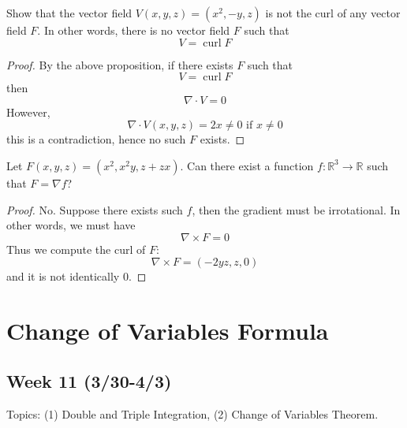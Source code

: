 \documentclass[openany]{book}
\newcommand{\R}{\mathbb{R}}
\newcommand{\curl}{\operatorname{curl}}
\begin{document}
\begin{prob}
    Show that the vector field $V(x,y,z)=(x^2, -y, z)$ is not the curl of any vector field $F$. In other words, there is no vector field $F$ such that 
    \begin{equation*}
        V=\curl F
    \end{equation*}
\end{prob}
\begin{proof}
    By the above proposition, if there exists $F$ such that 
    \begin{equation*}
        V=\curl F
    \end{equation*}
    then 
    \begin{equation*}
        \nabla\cdot V=0
    \end{equation*}
    However, 
    \begin{equation*}
        \nabla\cdot V(x,y,z)=2x\neq 0 \text{ if } x\neq 0
    \end{equation*}
    this is a contradiction, hence no such $F$ exists.
\end{proof}



\begin{prob}
    Let $F(x,y,z)=(x^2, x^2y, z+zx)$. Can there exist a function $f:\R^3\to\R$ such that $F=\nabla f$?
\end{prob}
\begin{proof}
    No. Suppose there exists such $f$, then the gradient must be irrotational. In other words, we must have 
    \begin{equation*}
        \nabla\times F=0
    \end{equation*}
    Thus we compute the curl of $F$:
    \begin{equation*}
        \nabla\times F=(-2yz, z, 0)
    \end{equation*}
    and it is not identically $0$.
\end{proof}

\chapter{Change of Variables Formula}


\section*{\centering Week 11 (3/30-4/3)}
Topics: (1) Double and Triple Integration, (2) Change of Variables Theorem.
\end{document}
